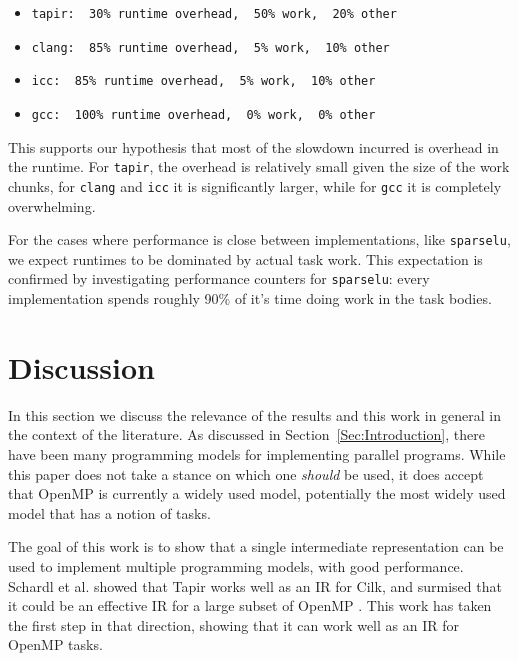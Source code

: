\documentclass[sigconf]{acmart}
\begin{document}
\begin{itemize}
\item \texttt{tapir: ~30\% runtime overhead, ~50\% work, ~20\% other}
\item \texttt{clang: ~85\% runtime overhead, ~5\% work, ~10\% other}
\item \texttt{icc: ~85\% runtime overhead, ~5\% work, ~10\% other}
\item \texttt{gcc: ~100\% runtime overhead, ~0\% work, ~0\% other}
\end{itemize}

This supports our hypothesis that most of the slowdown incurred is overhead in
the runtime. For \texttt{tapir}, the overhead is relatively small given the
size of the work chunks, for \texttt{clang} and \texttt{icc} it is
significantly larger, while for \texttt{gcc} it is completely overwhelming.

For the cases where performance is close between implementations, like
\texttt{sparselu}, we expect runtimes to be dominated by actual task work. This 
expectation is confirmed by investigating performance counters for \texttt{sparselu}:
every implementation spends roughly 90\% of it's time doing work in the task
bodies. 

\section{Discussion} \label{Sec:Discussion}

In this section we discuss the relevance of the results and this work in general
in the context of the literature. As discussed in Section~\ref{Sec:Introduction}, 
there have been many programming models for implementing parallel programs. While
this paper does not take a stance on which one \emph{should} be used, it does
accept that OpenMP is currently a widely used model, potentially the most
widely used model that has a notion of tasks. 

The goal of this work is to show that a single intermediate representation can be
used to implement multiple programming models, with good performance. Schardl et 
al. showed that Tapir works well as an IR for Cilk, and surmised that it could
be an effective IR for a large subset of OpenMP \cite{tapir}. This work has
taken the first step in that direction, showing that it can work well as an IR
for OpenMP tasks. 
\end{document}
